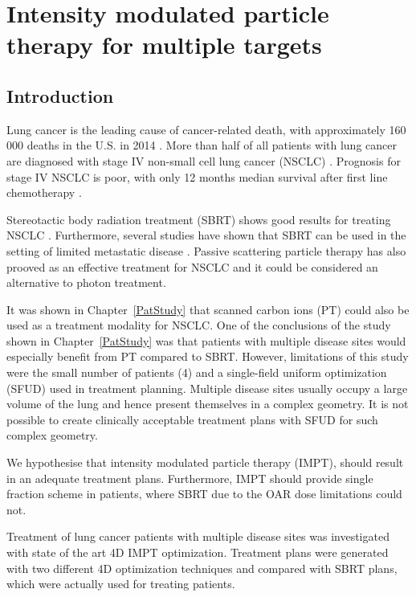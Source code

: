 \documentclass[type=dr, dr=rernat, accentcolor=tud7b,colorbacktitle, bigchapter, openright, twoside, 12pt ]{tudthesis}
\begin{document}
\chapter{Intensity modulated particle therapy for multiple targets}
\label{chapter:vmm}
\minitoc

\section{Introduction}

Lung cancer is the leading cause of cancer-related death, with approximately 160 000 deaths in the U.S. in 2014 \cite{Siegel2014}.
More than half of all patients with lung cancer are diagnosed with stage IV non-small cell lung cancer (NSCLC) \cite{Ramalingam2008, Iyengar2014}.
Prognosis for stage IV NSCLC is poor, with only 12 months median survival after first line chemotherapy \cite{Socinski2013}. 

Stereotactic body radiation treatment (SBRT) shows good results for treating NSCLC \cite{Baumann2009, Fakiris2009, Grutters2010, Greco2011}. 
Furthermore, several studies have shown that SBRT can be used in the setting of limited metastatic 
disease \cite{Rusthoven2009, Villaruz2012, Salama2012, Iyengar2014}. 
Passive scattering particle therapy has also prooved as an effective treatment for NSCLC \cite{Grutters2010, Tsujii2012} and it could be considered an alternative
to photon treatment.

It was shown in Chapter~\ref{PatStudy} that scanned carbon ions (PT) could also be used as a treatment modality for NSCLC. One of the conclusions of the study shown in Chapter~\ref{PatStudy} 
was that patients with multiple disease sites would especially benefit from PT compared to SBRT. However, limitations of this study were the small number of patients (4) and
a single-field uniform optimization (SFUD) used in treatment planning. Multiple disease sites usually occupy a large volume of the lung and hence present themselves in a complex geometry. 
It is not possible to create clinically acceptable treatment plans with SFUD for such complex geometry.

We hypothesise that intensity modulated particle therapy (IMPT), should result in an adequate treatment plans. Furthermore, IMPT 
should provide single fraction scheme in patients, where SBRT due to the OAR dose limitations could not. 

Treatment of lung cancer patients  with multiple disease sites was investigated with state of the art 4D IMPT optimization. 
Treatment plans were generated with two different 4D optimization techniques and compared with SBRT plans, which were actually used for treating patients.
\end{document}
